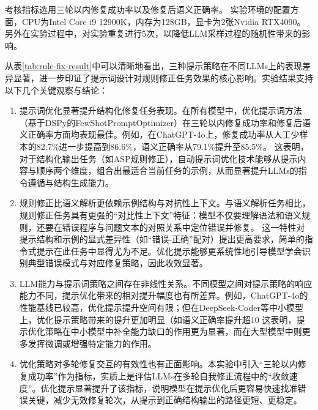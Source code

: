 考核指标选用三轮以内修复成功率以及修复后语义正确率。
实验环境的配置方面，CPU为Intel Core i9 12900K，内存为128GB，显卡为2张Nvidia RTX4090。
另外在实验过程中，对实验重复进行5次，以降低LLM采样过程的随机性带来的影响。

从表\ref{tab:rule-fix-result}中可以清晰地看出，三种提示策略在不同LLMs上的表现差异显著，进一步印证了提示词设计对规则修正任务效果的核心影响。实验结果支持以下几个关键观察与结论：
\begin{enumerate}[nosep]
\item 提示词优化显著提升结构化修复任务表现。在所有模型中，优化提示词方法（基于DSPy的FewShotPromptOptimizer）在三轮以内修复成功率和修复后语义正确率方面均表现最佳。例如，在ChatGPT-4o上，修复成功率从人工少样本的82.7\%进一步提高到86.6\%，语义正确率从79.1\%提升至85.5\%。
这表明，对于结构化输出任务（如ASP规则修正），自动提示词优化技术能够从提示内容与顺序两个维度，组合出最适合当前任务的示例，从而显著提升LLMs的指令遵循与结构生成能力。
\item 规则修正比语义解析更依赖示例结构与对抗性上下文。与语义解析任务相比，规则修正任务具有更强的“对比性上下文”特征：模型不仅要理解语法和语义规则，还要在错误程序与问题文本的对照关系中定位错误并修复。
这一特性对提示结构和示例的显式差异性（如“错误-正确”配对）提出更高要求，简单的指令式提示在此任务中显得尤为不足。优化提示能够更系统性地引导模型学会识别典型错误模式与对应修复策略，因此收效显著。
\item LLM能力与提示词策略之间存在非线性关系。不同模型之间对提示策略的响应能力不同，提示优化带来的相对提升幅度也有所差异。例如，ChatGPT-4o的性能基线已较高，优化提示提升空间有限；但在DeepSeek-Coder等中小模型上，优化提示策略带来的提升更加明显（如语义正确率提升超10%
这表明，提示优化策略在中小模型中补全能力缺口的作用更为显著，而在大型模型中则更多发挥微调或增强特定能力的作用。
\item 优化策略对多轮修复交互的有效性也有正面影响。本实验中引入“三轮以内修复成功率”作为指标，实质上是评估LLMs在多轮自我修正流程中的“收敛速度”。优化提示显著提升了该指标，说明模型在提示优化后更容易快速找准错误关键，减少无效修复轮次，从提示到正确结构输出的路径更短、更稳定。
\end{enumerate}
